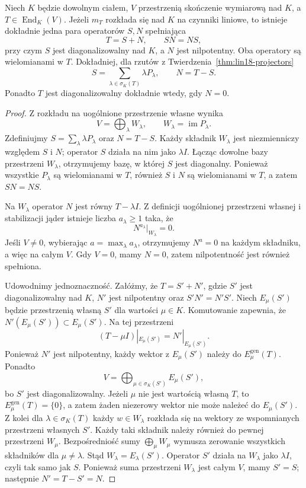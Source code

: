\begin{twierdzenie}
\label{thm:lin18-chevalley}
Niech \(K\) będzie dowolnym ciałem,
\(V\) przestrzenią skończenie wymiarową nad \(K\),
a \(T\in\operatorname{End}_K(V)\).
Jeżeli \(m_T\) rozkłada się
nad \(K\) na czynniki liniowe, to istnieje
dokładnie jedna para operatorów \(S,N\)
spełniająca
\[
 T=S+N,\qquad SN=NS,
\]
przy czym \(S\) jest diagonalizowalny
nad \(K\), a \(N\) jest nilpotentny.
Oba operatory są wielomianami w \(T\).
Dokładniej, dla rzutów
z Twierdzenia~\ref{thm:lin18-projectors}
\[
 S=\sum_{\lambda\in\sigma_K(T)}
       \lambda P_\lambda,\qquad N=T-S.
\]
Ponadto \(T\) jest diagonalizowalny
dokładnie wtedy, gdy \(N=0\).
\end{twierdzenie}
\begin{proof}
Z rozkładu na uogólnione przestrzenie własne
wynika
\[
 V=\bigoplus_{\lambda}W_\lambda,
 \qquad W_\lambda=\operatorname{im}P_\lambda.
\]
Zdefiniujmy \(S=\sum_\lambda\lambda P_\lambda\)
oraz \(N=T-S\).
Każdy składnik \(W_\lambda\)
jest niezmienniczy względem \(S\) i \(N\);
operator \(S\) działa na nim
jako \(\lambda I\).
Łącząc dowolne bazy przestrzeni
\(W_\lambda\), otrzymujemy bazę,
w której \(S\) jest diagonalny.
Ponieważ wszystkie \(P_\lambda\)
są wielomianami w \(T\),
również \(S\) i \(N\) są wielomianami
w \(T\), a zatem \(SN=NS\).

Na \(W_\lambda\) operator \(N\)
jest równy \(T-\lambda I\).
Z definicji uogólnionej przestrzeni własnej
i stabilizacji jąder istnieje
liczba \(a_\lambda\ge1\) taka, że
\[
 N^{a_\lambda}|_{W_\lambda}=0.
\]
Jeśli \(V\ne0\), wybierając
\(a=\max_\lambda a_\lambda\),
otrzymujemy \(N^a=0\) na każdym składniku,
a więc na całym \(V\).
Gdy \(V=0\), mamy \(N=0\), zatem
nilpotentność jest również spełniona.

Udowodnimy jednoznaczność.
Załóżmy, że \(T=S'+N'\), gdzie
\(S'\) jest diagonalizowalny nad \(K\),
\(N'\) jest nilpotentny oraz \(S'N'=N'S'\).
Niech \(E_\mu(S')\) będzie przestrzenią
własną \(S'\) dla wartości \(\mu\in K\).
Komutowanie zapewnia, że
\(N'(E_\mu(S'))\subset E_\mu(S')\).
Na tej przestrzeni
\[
 (T-\mu I)|_{E_\mu(S')}=N'|_{E_\mu(S')}.
\]
Ponieważ \(N'\) jest nilpotentny,
każdy wektor z \(E_\mu(S')\)
należy do \(E_\mu^{\mathrm{gen}}(T)\).
Ponadto
\[
 V=\bigoplus_{\mu\in\sigma_K(S')}E_\mu(S'),
\]
bo \(S'\) jest diagonalizowalny.
Jeżeli \(\mu\) nie jest wartością własną \(T\),
to \(E_\mu^{\mathrm{gen}}(T)=\{0\}\),
a zatem żaden niezerowy wektor
nie może należeć do \(E_\mu(S')\).
Z kolei dla \(\lambda\in\sigma_K(T)\)
każdy \(w\in W_\lambda\) rozkłada się
na wektory ze wspomnianych
przestrzeni własnych \(S'\).
Każdy taki składnik należy również
do pewnej przestrzeni \(W_\mu\).
Bezpośredniość sumy \(\bigoplus_\mu W_\mu\)
wymusza zerowanie wszystkich składników
dla \(\mu\ne\lambda\).
Stąd \(W_\lambda=E_\lambda(S')\).
Operator \(S'\) działa na \(W_\lambda\)
jako \(\lambda I\), czyli tak samo jak \(S\).
Ponieważ suma przestrzeni \(W_\lambda\)
jest całym \(V\), mamy \(S'=S\);
następnie \(N'=T-S'=N\).


\end{proof}
